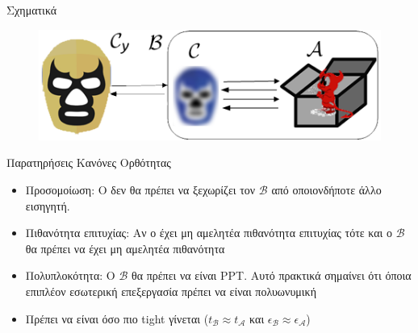 \documentclass[handout]{beamer}
\begin{document}
\begin{frame}{Σχηματικά}
\begin{figure}
\includegraphics[scale=0.8]{ProofReduction.png}  
\end{figure}
\end{frame}

\begin{frame}{Παρατηρήσεις}
Κανόνες Ορθότητας
\begin{itemize}
	\item Προσομοίωση: Ο \adv δεν θα πρέπει να ξεχωρίζει τον $\mathcal{B}$ από οποιονδήποτε άλλο εισηγητή.
	\item Πιθανότητα επιτυχίας: Αν ο \adv έχει μη αμελητέα πιθανότητα επιτυχίας τότε και ο $\mathcal{B}$ θα πρέπει να έχει μη αμελητέα πιθανότητα
	\item Πολυπλοκότητα: Ο $\mathcal{B}$ θα πρέπει να είναι PPT. Αυτό πρακτικά σημαίνει ότι όποια επιπλέον εσωτερική επεξεργασία  πρέπει να είναι πολυωνυμική  
	\item Πρέπει να είναι όσο πιο tight γίνεται ($t_\mathcal{B} \approx t_\mathcal{A}$ και $\epsilon_\mathcal{B} \approx \epsilon_\mathcal{A}$)
\end{itemize}
\end{frame}
\end{document}
